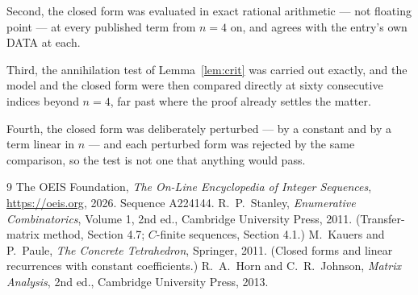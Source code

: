 \documentclass[11pt,a4paper]{article}
\theoremstyle{plain}
\theoremstyle{definition}
\begin{document}
Second, the closed form was evaluated in exact rational arithmetic --- not floating point ---
at every published term from $n=4$ on, and agrees with the entry's own DATA at each.

Third, the annihilation test of Lemma~\ref{lem:crit} was carried out exactly, and the model
and the closed form were then compared directly at sixty consecutive indices beyond
$n=4$, far past where the proof already settles the matter.

Fourth, the closed form was deliberately perturbed --- by a constant and by a term linear in
$n$ --- and each perturbed form was rejected by the same comparison, so the test is not one
that anything would pass.

\begin{thebibliography}{9}
 The OEIS Foundation, \emph{The On-Line Encyclopedia of Integer
Sequences}, \url{https://oeis.org}, 2026. Sequence A224144.
 R.~P.~Stanley, \emph{Enumerative Combinatorics}, Volume 1, 2nd ed.,
Cambridge University Press, 2011. (Transfer-matrix method, Section 4.7; $C$-finite sequences,
Section 4.1.)
 M.~Kauers and P.~Paule, \emph{The Concrete Tetrahedron}, Springer, 2011.
(Closed forms and linear recurrences with constant coefficients.)
 R.~A.~Horn and C.~R.~Johnson, \emph{Matrix Analysis}, 2nd ed., Cambridge
University Press, 2013.
\end{thebibliography}
\end{document}

